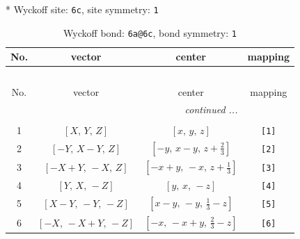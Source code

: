 \documentclass[fleqn,8pt]{jsarticle}
\begin{document}
* Wyckoff site: {\tt 6c}, site symmetry: {\tt 1}
\renewcommand{\arraystretch}{1.2}
\begin{longtable}{cccc}
\caption{Wyckoff bond: {\tt 6a@6c}, bond symmetry: {\tt 1}}
 \\
 \hline \hline
No. & vector & center & mapping \\ \hline \endfirsthead

\multicolumn{3}{l}{\tablename\ \thetable{}} \\
 \hline \hline
No. & vector & center & mapping \\ \hline \endhead

 \hline \hline
\multicolumn{3}{r}{\footnotesize\it continued ...} \\ \endfoot

 \hline \hline
\multicolumn{3}{r}{} \\ \endlastfoot

1 & $\left[ X,\, Y,\, Z \right]$ & $\left[ x,\, y,\, z \right]$ & {\tt [1]} \\ \hline
2 & $\left[ - Y,\, X - Y,\, Z \right]$ & $\left[ - y,\, x - y,\, z + \frac{2}{3} \right]$ & {\tt [2]} \\ \hline
3 & $\left[ - X + Y,\, - X,\, Z \right]$ & $\left[ - x + y,\, - x,\, z + \frac{1}{3} \right]$ & {\tt [3]} \\ \hline
4 & $\left[ Y,\, X,\, - Z \right]$ & $\left[ y,\, x,\, - z \right]$ & {\tt [4]} \\ \hline
5 & $\left[ X - Y,\, - Y,\, - Z \right]$ & $\left[ x - y,\, - y,\, \frac{1}{3} - z \right]$ & {\tt [5]} \\ \hline
6 & $\left[ - X,\, - X + Y,\, - Z \right]$ & $\left[ - x,\, - x + y,\, \frac{2}{3} - z \right]$ & {\tt [6]} \\
\end{longtable}
\end{document}
